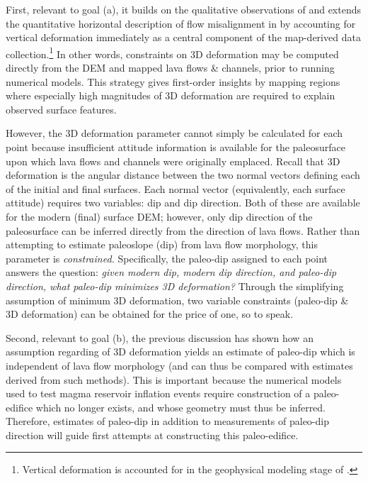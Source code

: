 First, relevant to goal (a), it builds on the qualitative observations of \textcite{mouginis-mark_late-stage_2019} and extends the quantitative horizontal description of flow misalignment in \textcite{chadwick_late_2015} by accounting for vertical deformation immediately as a central component of the map-derived data collection.\footnote{Vertical deformation is accounted for in the geophysical modeling stage of \textcite{chadwick_late_2015}.} In other words, constraints on 3D deformation may be computed directly from the \ac{DEM} and mapped lava flows \& channels, prior to running numerical models. This strategy gives first-order insights by mapping regions where especially high magnitudes of 3D deformation are required to explain observed surface features. 

However, the 3D deformation parameter cannot simply be calculated for each point because insufficient attitude information is available for the paleosurface upon which lava flows and channels were originally emplaced. Recall that 3D deformation is the angular distance between the two normal vectors defining each of the initial and final surfaces. Each normal vector (equivalently, each surface attitude) requires two variables: dip and dip direction. Both of these are available for the modern (final) surface \ac{DEM}; however, only dip direction of the paleosurface can be inferred directly from the direction of lava flows. Rather than attempting to estimate paleoslope (dip) from lava flow morphology, this parameter is \textit{constrained.} Specifically, the paleo-dip assigned to each point answers the question: \textit{given modern dip, modern dip direction, and paleo-dip direction, what paleo-dip minimizes 3D deformation?} Through the simplifying assumption of minimum 3D deformation, two variable constraints (paleo-dip \& 3D deformation) can be obtained for the price of one, so to speak.

Second, relevant to goal (b), the previous discussion has shown how an assumption regarding of 3D deformation yields an estimate of paleo-dip which is independent of lava flow morphology (and can thus be compared with estimates derived from such methods). This is important because the numerical models used to test magma reservoir inflation events require construction of a paleo-edifice which no longer exists, and whose geometry must thus be inferred. Therefore, estimates of paleo-dip in addition to measurements of paleo-dip direction will guide first attempts at constructing this paleo-edifice.

